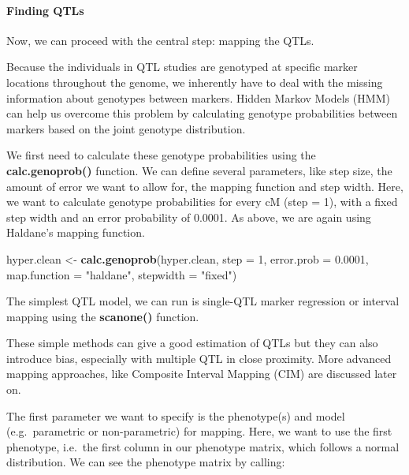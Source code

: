 \documentclass[12pt,]{krantz}
\newenvironment{Shaded}{\begin{snugshade}}{\end{snugshade}}
\newcommand{\KeywordTok}[1]{\textcolor[rgb]{0.27,0.27,0.27}{\textbf{{#1}}}}
\newcommand{\DataTypeTok}[1]{\textcolor[rgb]{0.27,0.27,0.27}{{#1}}}
\newcommand{\DecValTok}[1]{\textcolor[rgb]{0.06,0.06,0.06}{{#1}}}
\newcommand{\FloatTok}[1]{\textcolor[rgb]{0.06,0.06,0.06}{{#1}}}
\newcommand{\StringTok}[1]{\textcolor[rgb]{0.5,0.5,0.5}{{#1}}}
\newcommand{\NormalTok}[1]{{#1}}
\let\oldparagraph\paragraph
\renewcommand{\paragraph}[1]{\oldparagraph{#1}\mbox{}}
\begin{document}
\paragraph{Finding QTLs}\label{finding-qtls}

Now, we can proceed with the central step: mapping the QTLs.

Because the individuals in QTL studies are genotyped at specific marker
locations throughout the genome, we inherently have to deal with the
missing information about genotypes between markers. Hidden Markov
Models (HMM) can help us overcome this problem by calculating genotype
probabilities between markers based on the joint genotype distribution.

We first need to calculate these genotype probabilities using the
\textbf{calc.genoprob()} function. We can define several parameters,
like step size, the amount of error we want to allow for, the mapping
function and step width. Here, we want to calculate genotype
probabilities for every cM (step = 1), with a fixed step width and an
error probability of 0.0001. As above, we are again using Haldane's
mapping function.

\begin{Shaded}
\begin{Highlighting}[]
\NormalTok{hyper.clean <-}\StringTok{ }\KeywordTok{calc.genoprob}\NormalTok{(hyper.clean, }\DataTypeTok{step =} \DecValTok{1}\NormalTok{, }
                             \DataTypeTok{error.prob =} \FloatTok{0.0001}\NormalTok{, }
                             \DataTypeTok{map.function =} \StringTok{"haldane"}\NormalTok{, }
                             \DataTypeTok{stepwidth =} \StringTok{"fixed"}\NormalTok{)}
\end{Highlighting}
\end{Shaded}

The simplest QTL model, we can run is single-QTL marker regression or
interval mapping using the \textbf{scanone()} function.

These simple methods can give a good estimation of QTLs but they can
also introduce bias, especially with multiple QTL in close proximity.
More advanced mapping approaches, like Composite Interval Mapping (CIM)
are discussed later on.

The first parameter we want to specify is the phenotype(s) and model
(e.g.~parametric or non-parametric) for mapping. Here, we want to use
the first phenotype, i.e.~the first column in our phenotype matrix,
which follows a normal distribution. We can see the phenotype matrix by
calling:
\end{document}
